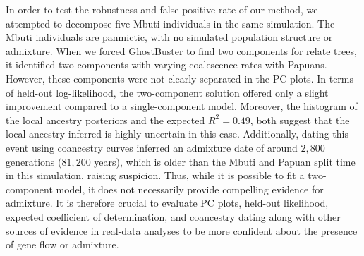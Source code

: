 In order to test the robustness and false-positive rate of our method, we attempted to decompose five Mbuti individuals in the same simulation. The Mbuti individuals are panmictic, with no simulated population structure or admixture. When we forced GhostBuster to find two components for relate trees, it identified two components with varying coalescence rates with Papuans. However, these components were not clearly separated in the PC plots. In terms of held-out log-likelihood, the two-component solution offered only a slight improvement compared to a single-component model. Moreover, the histogram of the local ancestry posteriors and the expected $R^2 = 0.49$, both suggest that the local ancestry inferred is highly uncertain in this case. Additionally, dating this event using coancestry curves inferred an admixture date of around $2{,}800$ generations ($81{,}200$ years), which is older than the Mbuti and Papuan split time in this simulation, raising suspicion. Thus, while it is possible to fit a two-component model, it does not necessarily provide compelling evidence for admixture. It is therefore crucial to evaluate PC plots, held-out likelihood, expected coefficient of determination, and coancestry dating along with other sources of evidence in real-data analyses to be more confident about the presence of gene flow or admixture.

